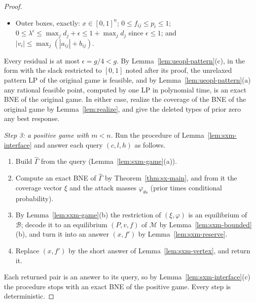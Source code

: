 \begin{proof}
\begin{itemize}[nosep]
$d_jw_j\ge\lambda^\epsilon-\epsilon$. At a free target both hold, so
$\lambda^\epsilon-\epsilon\le d_jw_j\le\lambda^\epsilon$.
\item Outer boxes, exactly: $x\in[0,1]^n$; $0\le f_{ij}\le p_i\le1$;
$0\le\lambda^\epsilon\le\max_jd_j+\epsilon\le1+\max_jd_j$ since $\epsilon\le1$; and
$|v_i|\le\max_j(|a_{ij}|+b_{ij})$.
\end{itemize}
Every residual is at most $\epsilon=g/4<g$. By Lemma~\ref{lem:ueopl-pattern}(c), in the form with the
slack restricted to $[0,1]$ noted after its proof, the unrelaxed pattern LP of the original game is
feasible, and by Lemma~\ref{lem:ueopl-pattern}(a) any rational feasible point, computed by one LP in
polynomial time, is an exact BNE of the original game. In either case, realize the coverage of the BNE
of the original game by Lemma~\ref{lem:realize}, and give the deleted types of prior zero any best
response.

\emph{Step 3: a positive game with $m<n$.} Run the procedure of Lemma~\ref{lem:sxm-interface} and answer
each query $(c,l,h)$ as follows.
\begin{enumerate}[nosep,label=(\roman*)]
\item Build $\widehat\Gamma$ from the query (Lemma~\ref{lem:sxm-game}(a)).
\item Compute an exact BNE of $\widehat\Gamma$ by Theorem~\ref{thm:sx-main}, and from it the coverage
vector $\xi$ and the attack masses $\varphi_{\theta s}$ (prior times conditional probability).
\item By Lemma~\ref{lem:sxm-game}(b) the restriction of $(\xi,\varphi)$ is an equilibrium of
$\mathcal B$; decode it to an equilibrium $(P,v,f)$ of $\mathcal M$ by
Lemma~\ref{lem:sxm-bounded}(b), and turn it into an answer $(x,f')$ by Lemma~\ref{lem:sxm-reserve}.
\item Replace $(x,f')$ by the short answer of Lemma~\ref{lem:sxm-vertex}, and return it.
\end{enumerate}
Each returned pair is an answer to its query, so by Lemma~\ref{lem:sxm-interface}(c) the procedure stops
with an exact BNE of the positive game. Every step is deterministic.


\end{proof}
